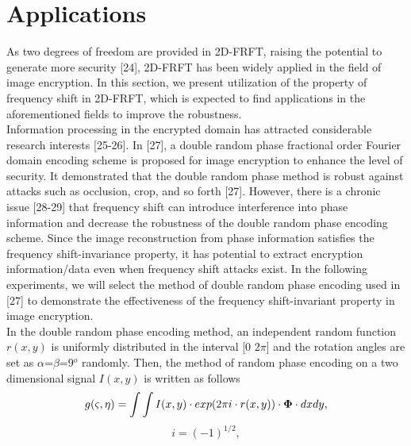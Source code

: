 \documentclass[journal]{IEEEtran}
\begin{document}
\section{Applications}
As two degrees of freedom are provided in 2D-FRFT, raising the potential to generate more security [24], 2D-FRFT has been widely applied in the field of image encryption. In this section, we present utilization of the property of frequency shift in 2D-FRFT, which is expected to find applications in the aforementioned fields to improve the robustness.\\\indent Information processing in the encrypted domain has attracted considerable research interests [25-26]. In [27], a double random phase fractional order Fourier domain encoding scheme is proposed for image encryption to enhance the level of security. It demonstrated that the double random phase method is robust against attacks such as occlusion, crop, and so forth [27]. However, there is a chronic issue [28-29] that frequency shift can introduce interference into phase information and decrease the robustness of the double random phase encoding scheme. Since the image reconstruction from phase information satisfies the frequency shift-invariance property, it has potential to extract encryption information/data even when frequency shift attacks exist. In the following experiments, we will select the method of double random phase encoding used in [27] to demonstrate the effectiveness of the frequency shift-invariant property in image encryption.\\\indent In the double random phase encoding method, an independent random function $r(x,y)$ is uniformly distributed in the interval [0 2$\pi$] and the rotation angles are set as $\alpha$=$\beta$=9$^o$ randomly. Then, the method of random phase encoding on a two dimensional signal \emph{$I(x,y)$} is written as follows
\begin{equation}
g(\varsigma ,\eta ) = \int {\int {I(x,y)\cdot exp(2\pi i \cdot r(x,y))\cdot {\bf{\Phi }} \cdot dxdy} },
\end{equation}
\begin{equation}
i=(-1)^{1/2},
\end{equation}
\end{document}

